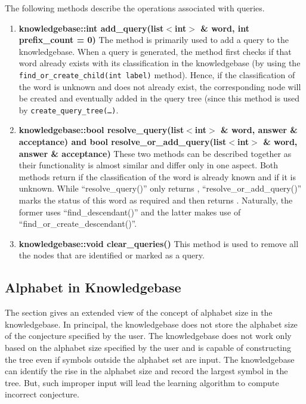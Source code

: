 \vskip 1pt
The following methods describe the operations associated with queries.

\begin{enumerate}

\item \textbf{knowledgebase::int add\_query(list$<$int$>$ \& word, int prefix\_count = 0)} \vskip 1pt
The method is primarily used to add a query to the knowledgebase. When a query is generated, the method first checks if that word already exists with its classification in the knowledgebase (by using the \texttt{find\_or\_create\_child(int label)} method). Hence, if the classification of the word is unknown and does not already exist, the corresponding node will be created and eventually added in the query tree (since this method is used by \texttt{create\_query\_tree(\ldots)}.
  	
\item \textbf{knowledgebase::bool resolve\_query(list$<$int$>$ \& word, answer \& acceptance) and bool resolve\_or\_add\_query(list$<$int$>$ \& word, answer \& acceptance)} \hfill \vskip 1pt
These two methods can be described together as their functionality is almost similar and differ only in one aspect. Both methods return \true if the classification of the word is already known and \false if it is unknown. While ``resolve\_query()'' only returns \false, ``resolve\_or\_add\_query()'' marks the status of this word as required and then returns \false. Naturally, the former uses ``find\_descendant()'' and the latter makes use of ``find\_or\_create\_descendant()''.

\item \textbf{knowledgebase::void clear\_queries()} \hfill \vskip 1pt
This method is used to remove all the nodes that are identified or marked as a query.
\end{enumerate}
\vskip 1pt
\vskip 1pt

\subsection*{Alphabet in Knowledgebase}
The section gives an extended view of the concept of alphabet size in the knowledgebase. In principal, the knowledgebase does not store the alphabet size of the conjecture specified by the user. The knowledgebase does not work only based on the alphabet size specified by the user and is capable of constructing the tree even if symbols outside the alphabet set are input. The knowledgebase can identify the rise in the alphabet size and record the largest symbol in the tree. But, such improper input will lead the learning algorithm to compute incorrect conjecture.

